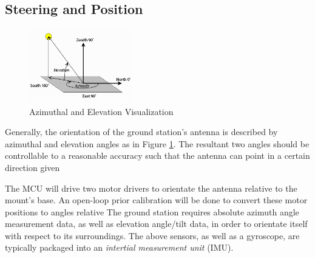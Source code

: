 \subsection{Steering and Position}
\begin{figure}[!htb]
    \centering
    \includegraphics[width=0.4\textwidth]{az_elevation}
    \caption{Azimuthal and Elevation Visualization \cite{site-azElevationVisual}}
    \label{fig:az_elevation}
\end{figure}

Generally, the orientation of the ground station's antenna is described by azimuthal and elevation angles as in Figure \ref{fig:az_elevation}. The resultant two angles should be controllable to a reasonable accuracy such that the antenna can point in a certain direction given

The MCU will drive two motor drivers to orientate the antenna relative to the mount's base. An open-loop prior calibration will be done to convert these motor positions to angles relative 
The ground station requires absolute azimuth angle measurement data, as well as elevation angle/tilt data, in order to orientate itself with respect to its surroundings. The above sensors, as well as a gyroscope, are typically packaged into an \textit{intertial measurement unit} (IMU). 